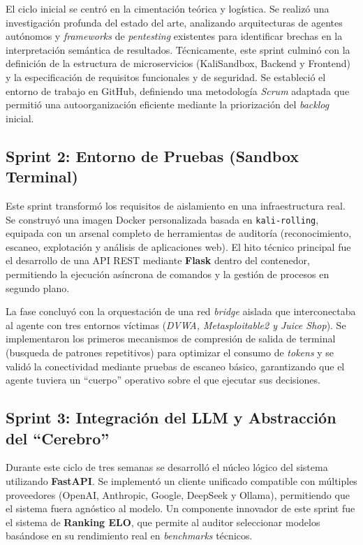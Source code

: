 El ciclo inicial se centró en la cimentación teórica y logística. Se realizó una investigación profunda del estado del arte, analizando arquitecturas de agentes autónomos y \textit{frameworks} de \textit{pentesting} existentes para identificar brechas en la interpretación semántica de resultados. Técnicamente, este sprint culminó con la definición de la estructura de microservicios (KaliSandbox, Backend y Frontend) y la especificación de requisitos funcionales y de seguridad. Se estableció el entorno de trabajo en GitHub, definiendo una metodología \textit{Scrum} adaptada que permitió una autoorganización eficiente mediante la priorización del \textit{backlog} inicial.

\subsection*{Sprint 2: Entorno de Pruebas (Sandbox Terminal)}

Este sprint transformó los requisitos de aislamiento en una infraestructura real. Se construyó una imagen Docker personalizada basada en \texttt{kali-rolling}, equipada con un arsenal completo de herramientas de auditoría (reconocimiento, escaneo, explotación y análisis de aplicaciones web). El hito técnico principal fue el desarrollo de una API REST mediante \textbf{Flask} dentro del contenedor, permitiendo la ejecución asíncrona de comandos y la gestión de procesos en segundo plano.

La fase concluyó con la orquestación de una red \textit{bridge} aislada que interconectaba al agente con tres entornos víctimas (\textit{DVWA, Metasploitable2 y Juice Shop}). %
Se implementaron los primeros mecanismos de compresión de salida de terminal (busqueda de patrones repetitivos) para optimizar el consumo de \textit{tokens} y se validó la conectividad mediante pruebas de escaneo básico, garantizando que el agente tuviera un ``cuerpo'' operativo sobre el que ejecutar sus decisiones.

\subsection*{Sprint 3: Integración del LLM y Abstracción del ``Cerebro''}

Durante este ciclo de tres semanas se desarrolló el núcleo lógico del sistema utilizando \textbf{FastAPI}. Se implementó un cliente unificado compatible con múltiples proveedores (OpenAI, Anthropic, Google, DeepSeek y Ollama), permitiendo que el sistema fuera agnóstico al modelo. Un componente innovador de este sprint fue el sistema de \textbf{Ranking ELO}, que permite al auditor seleccionar modelos basándose en su rendimiento real en \textit{benchmarks} técnicos.

